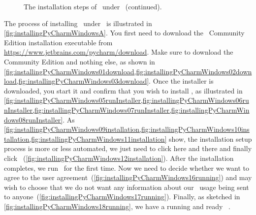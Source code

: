 %
\begin{figure}%
\ContinuedFloat%
\centering%
%
%
%
\floatSep%
%
%
%
\caption[]{The installation steps of \pycharm\ under \microsoftWindows~(continued).}%
\label{fig:installingPyCharmWindowsC}%
\end{figure}%
%
The process of installing \pycharm\ under \microsoftWindows\ is illustrated in \cref{fig:installingPyCharmWindowsA}.
You first need to download the \pycharm\ Community Edition installation executable from \url{https://www.jetbrains.com/pycharm/download}.
Make sure to download the Community Edition and nothing else, as shown in \cref{fig:installingPyCharmWindows01download,fig:installingPyCharmWindows02download,fig:installingPyCharmWindows03download}.
Once the installer is downloaded, you start it and confirm that you wish to install \pycharm, as illustrated in \cref{fig:installingPyCharmWindows05runInstaller,fig:installingPyCharmWindows06runInstaller,fig:installingPyCharmWindows07runInstaller,fig:installingPyCharmWindows08runInstaller}.
As \cref{fig:installingPyCharmWindows09installation,fig:installingPyCharmWindows10installation,fig:installingPyCharmWindows11installation} show, the installation setup process is more or less automated, we just need to click  here and there and finally click ~(\cref{fig:installingPyCharmWindows12installation}).
After the installation completes, we run \pycharm\ for the first time.
Now we need to decide whether we want to agree to the user agreement~(\cref{fig:installingPyCharmWindows16running}) and may wish to choose that we do not want any information about our \pycharm\ usage being sent to anyone~(\cref{fig:installingPyCharmWindows17running}).
Finally, as sketched in \cref{fig:installingPyCharmWindows18running}, we have a running and ready \pycharm\ .%
%
\FloatBarrier%
\endhsection%
%
